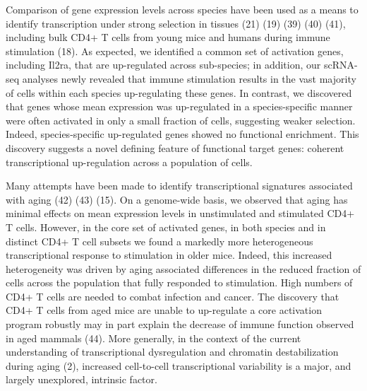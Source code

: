 Comparison of gene expression levels across species have been used as a means to identify transcription under strong selection in tissues (21) (19) (39) (40) (41), including bulk CD4+ T cells from young mice and humans during immune stimulation (18). As expected, we identified a common set of activation genes, including Il2ra, that are up-regulated across sub-species; in addition, our scRNA-seq analyses newly revealed that immune stimulation results in the vast majority of cells within each species up-regulating these genes. In contrast, we discovered that genes whose mean expression was up-regulated in a species-specific manner were often activated in only a small fraction of cells, suggesting weaker selection. Indeed, species-specific up-regulated genes showed no functional enrichment. This discovery suggests a novel defining feature of functional target genes: coherent transcriptional up-regulation across a population of cells. 

Many attempts have been made to identify transcriptional signatures associated with aging (42) (43) (15). On a genome-wide basis, we observed that aging has minimal effects on mean expression levels in unstimulated and stimulated CD4+ T cells. However, in the core set of activated genes, in both species and in distinct CD4+ T cell subsets we found a markedly more heterogeneous transcriptional response to stimulation in older mice. Indeed, this increased heterogeneity was driven by aging associated differences in the reduced fraction of cells across the population that fully responded to stimulation. High numbers of CD4+ T cells are needed to combat infection and cancer. The discovery that CD4+ T cells from aged mice are unable to up-regulate a core activation program robustly may in part explain the decrease of immune function observed in aged mammals (44). More generally, in the context of the current understanding of transcriptional dysregulation and chromatin destabilization during aging (2), increased cell-to-cell transcriptional variability is a major, and largely unexplored, intrinsic factor.



